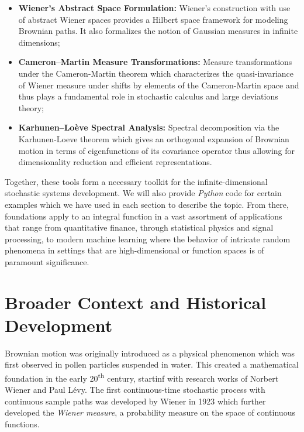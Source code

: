 \documentclass[12pt]{report}
\begin{document}
\begin{itemize} \item \textbf{Wiener’s Abstract Space Formulation:} Wiener's construction with use of abstract Wiener spaces provides a Hilbert space framework for modeling Brownian paths. It also formalizes the notion of Gaussian measures in infinite dimensions; 
\item \textbf{Cameron–Martin Measure Transformations:} Measure transformations under the Cameron-Martin theorem which characterizes the quasi-invariance of Wiener measure under shifts by elements of the Cameron-Martin space and thus plays a fundamental role in stochastic calculus and large deviations theory;
\item \textbf{Karhunen–Loève Spectral Analysis:} Spectral decomposition via the Karhunen-Loeve theorem which gives an orthogonal expansion of Brownian motion in terms of eigenfunctions of its covariance operator thus allowing for dimensionality reduction and efficient representations. \end{itemize}

Together, these tools form a necessary toolkit for the infinite-dimensional stochastic systems development. We will also provide \textit{Python} code for certain examples which we have used in each section to describe the topic. From there, foundations apply to an integral function in a vast assortment of applications that range from quantitative finance, through statistical physics and signal processing, to modern machine learning where the behavior of intricate random phenomena in settings that are high-dimensional or function spaces is of paramount significance.

\section{Broader Context and Historical Development}

Brownian motion was originally introduced as a physical phenomenon which was first observed in pollen particles suspended in water. This created a mathematical foundation in the early 20\textsuperscript{th} century, startinf with research works of Norbert Wiener and Paul Lévy. 
The first continuous-time stochastic process with continuous sample paths was developed by Wiener in 1923 which further developed the \textit{Wiener measure}, a probability measure on the space of continuous functions.
\end{document}
